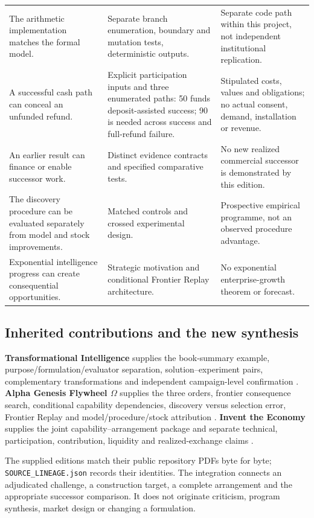 \begin{longtable}{P{1.55in}P{2.32in}P{2.05in}}
The arithmetic implementation matches the formal model. & Separate branch enumeration, boundary and mutation tests, deterministic outputs. & Separate code path within this project, not independent institutional replication.\\
A successful cash path can conceal an unfunded refund. & Explicit participation inputs and three enumerated paths: 50 funds deposit-assisted success; 90 is needed across success and full-refund failure. & Stipulated costs, values and obligations; no actual consent, demand, installation or revenue.\\
An earlier result can finance or enable successor work. & Distinct evidence contracts and specified comparative tests. & No new realized commercial successor is demonstrated by this edition.\\
The discovery procedure can be evaluated separately from model and stock improvements. & Matched controls and crossed experimental design. & Prospective empirical programme, not an observed procedure advantage.\\
Exponential intelligence progress can create consequential opportunities. & Strategic motivation and conditional Frontier Replay architecture. & No exponential enterprise-growth theorem or forecast.\\
\bottomrule
\end{longtable}

\subsection{Inherited contributions and the new synthesis}
\textbf{Transformational Intelligence} supplies the book-summary example, purpose/formulation/evaluator separation, solution--experiment pairs, complementary transformations and independent campaign-level confirmation \citep[\S1--2, \S5, \S7--8 and Appendix C]{boucher_ti}. \textbf{Alpha Genesis Flywheel $\Omega$} supplies the three orders, frontier consequence search, conditional capability dependencies, discovery versus selection error, Frontier Replay and model/procedure/stock attribution \citep[\S3--7 and \S12]{boucher_genesis}. \textbf{Invent the Economy} supplies the joint capability--arrangement package and separate technical, participation, contribution, liquidity and realized-exchange claims \citep[\S2--7 and \S11--12]{boucher_economy}.

The supplied editions match their public repository PDFs byte for byte; \texttt{SOURCE\_LINEAGE.json} records their identities. The integration connects an adjudicated challenge, a construction target, a complete arrangement and the appropriate successor comparison. It does not originate criticism, program synthesis, market design or changing a formulation.

